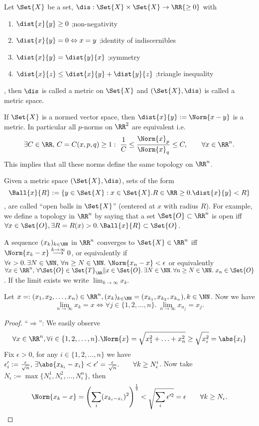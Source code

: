 \begin{defn}
 Let $\Set{X}$ be a set, $\dis:\Set{X}\times\Set{X}\to\RR{\geq 0}$ with 
 \begin{enumerate}
 \item $\dist{x}{y} \geq 0$ \qquad ;non-negativity
  \item $\dist{x}{y}=0\Leftrightarrow x=y$ \qquad ;identity of indiscernibles
  \item $\dist{x}{y}=\dist{y}{x}$ \qquad ;symmetry
  \item $\dist{x}{z}\leq \dist{x}{y}+\dist{y}{z}$ \qquad ;triangle inequality
 \end{enumerate}, then $\dis$ is called a metric on $\Set{X}$ and $(\Set{X}, \dis)$ is called a metric space.
\end{defn}
\begin{exc}
 If $\Set{X}$ is a normed vector space, then $\dist{x}{y}:=\Norm{x-y}$ is a metric. 
 In particular all $p$-norms on $\RR^2$ are equivalent i.e.
 $$\exists C\in\RR,\,C=C(x,p,q)\geq 1:\ \frac{1}{C}\leq\frac{\Norm{x}_p}{\Norm{x}_q}\leq C, \qquad\forall x\in\RR^n.$$
 This implies that all these norms define the same topology on $\RR^n$. 
\end{exc}
\begin{rem}
  Given a metric space $(\Set{X}, \dis)$, sets of the form
  $$\Ball{x}{R}:=\{y\in\Set{X}: x\in\Set{X}. R \in \RR \geq 0. \dist{x}{y}<R\}$$
  , are called ``open balls in $\Set{X}$'' (centered at $x$ with radius $R$). For example, we define a topology in $\RR^n$ by saying that a set $\Set{O}\subset\RR^n$ is open iff $\forall x\in\Set{O}, \exists R=R(x)>0. \,\Ball{x}{R}\subset\Set{O}$.
\end{rem}
\begin{defn}
 A sequence $(x_k)_{k\in\NN}$ in $\RR^n$ converges to $\Set{X}\in\RR^n$ iff $\Norm{x_k-x}\overset{k\to\infty}{\longrightarrow}0$, or equivalently if $\forall \epsilon>0.\,\exists N\in\NN, \,\forall n\geq N\in\NN.\ \Norm{x_n-x}<\epsilon$ or equivalently $\forall x\in\RR^n,\,\forall \Set{O}\in\Set{T}_{\RR}\|x\in\Set{O}.\,\exists N\in\NN.\,\forall n\geq N\in\NN.\ x_n\in\Set{O}$. If the limit exists we write $\lim_{k\to\infty}x_k$.
\end{defn}
\begin{lem}
 \label{lem:comp}
 Let $x=:(x_1, x_2,\ldots,x_n)\in\RR^n, (x_k)_{k\in\NN}=(x_{k_1},x_{k_2}, x_{k_n}), k\in\NN$.
 Now we have $$\lim_{n\to\infty}x_k=x\Leftrightarrow \forall j\in \{1,2,\ldots,n\}.\ \lim_{n\to\infty}x_{n_j}=x_j.$$
\end{lem}
\begin{proof}
 ``$\Rightarrow$'': We easily observe $$\forall x\in\RR^n, \forall i\in\{1, 2, \ldots,n\}. \Norm{x}=\sqrt{x_1^2+\ldots+x_n^2}\geq \sqrt{x_i ^2}=\abs{x_i}$$
 Fix $\epsilon>0$, for any $i\in\{1, 2, \ldots, n\}$ we have $\epsilon_i':=\frac{\epsilon}{\sqrt{n}},\,\exists\abs{x_{k_i}-x_i}<\epsilon'=\frac{\epsilon}{\sqrt{n}}.\qquad\forall k\geq N_{\epsilon}^i$. Now take $N_\epsilon:=\max\{N_{\epsilon}^1, N_{\epsilon}^2, \ldots, N_{\epsilon}^n\}$, then $$\Norm{x_k-x}=\left(\sum_i(x_{k_i-x_i})^2\right)^{\frac{1}{2}}<\sqrt{\sum_i \epsilon'^2}=\epsilon\qquad\forall k\geq N_\epsilon.$$
\end{proof}

